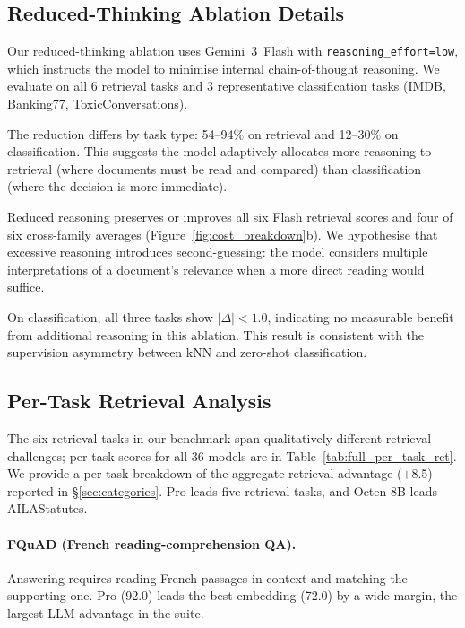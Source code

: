 \subsection{Reduced-Thinking Ablation Details}
\label{app:ablation_reduced}

Our reduced-thinking ablation uses Gemini~3~Flash with \texttt{reasoning\_effort=low}, which instructs the model to minimise internal chain-of-thought reasoning.
We evaluate on all 6 retrieval tasks and 3 representative classification tasks (IMDB, Banking77, ToxicConversations).

The reduction differs by task type: 54--94\% on retrieval and 12--30\% on classification.
This suggests the model adaptively allocates more reasoning to retrieval (where documents must be read and compared) than classification (where the decision is more immediate).

Reduced reasoning preserves or improves all six Flash retrieval scores and four of six cross-family averages (Figure~\ref{fig:cost_breakdown}b).
We hypothesise that excessive reasoning introduces second-guessing: the model considers multiple interpretations of a document's relevance when a more direct reading would suffice.

On classification, all three tasks show $|\Delta| < 1.0$, indicating no measurable benefit from additional reasoning in this ablation.
This result is consistent with the supervision asymmetry between kNN and zero-shot classification.





\subsection{Per-Task Retrieval Analysis}
\label{app:retrieval_detail}

The six retrieval tasks in our benchmark span qualitatively different retrieval challenges; per-task scores for all 36 models are in Table~\ref{tab:full_per_task_ret}.
We provide a per-task breakdown of the aggregate retrieval advantage ($+$8.5) reported in \S\ref{sec:categories}.
Pro leads five retrieval tasks, and Octen-8B leads AILAStatutes.

\paragraph{FQuAD (French reading-comprehension QA).}
Answering requires reading French passages in context and matching the supporting one.
Pro (92.0) leads the best embedding (72.0) by a wide margin, the largest LLM advantage in the suite.

